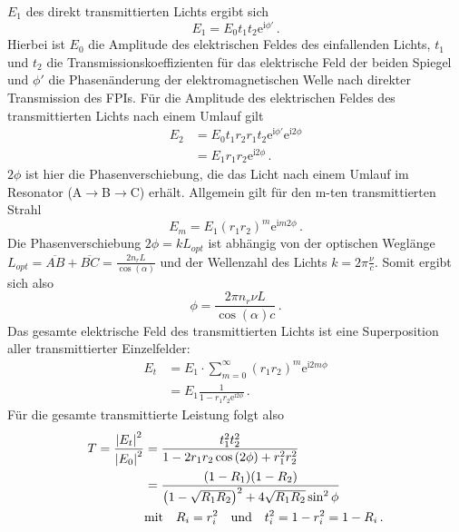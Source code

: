 $E_1$ des direkt transmittierten Lichts ergibt sich
\begin{equation}\label{eq:FPI_E1}
	E_1=E_0t_1t_2\mathrm{e}^{\mathrm{i}\phi'}\,.
\end{equation}
Hierbei ist $E_0$ die Amplitude des elektrischen Feldes des einfallenden Lichts,
$t_1$ und $t_2$ die Transmissionskoeffizienten für das elektrische Feld
der beiden Spiegel und $\phi'$ die Phasenänderung der elektromagnetischen Welle
nach direkter Transmission des FPIs. Für die Amplitude des elektrischen Feldes des
transmittierten Lichts nach einem Umlauf gilt
\begin{equation}\label{eq:FPI_E2}
	\begin{split}
		E_2
		&=E_0t_1r_2r_1t_2\mathrm{e}^{\mathrm{i}\phi'}\mathrm{e}^{\mathrm{i}2\phi}\\
		&=E_1r_1r_2\mathrm{e}^{\mathrm{i}2\phi}\,.
	\end{split}
\end{equation}
$2\phi$ ist hier die Phasenverschiebung, die das Licht nach einem Umlauf im
Resonator (A$\rightarrow$B$\rightarrow$C) erhält. Allgemein gilt für den m-ten
transmittierten Strahl
\begin{equation}\label{eq:FPI_Em}
	E_m=E_1(r_1r_2)^m\mathrm{e}^{\mathrm{i}m2\phi}\,.
\end{equation}
Die Phasenverschiebung $2\phi=kL_{opt}$ ist abhängig von der optischen Weglänge
$L_{opt}=\overline{AB}+\overline{BC}=\frac{2n_rL}{\cos{(\alpha)}}$ und der Wellenzahl des
Lichts $k=2\pi\frac{\nu}{c}$. Somit ergibt sich also
\begin{equation}\label{eq:FPI_phase}
	\phi=\frac{2\pi n_r\nu L}{\cos{(\alpha)}c}\,.
\end{equation}
Das gesamte elektrische Feld des transmittierten Lichts ist eine Superposition
aller transmittierter Einzelfelder:
\begin{equation}\label{eq:FPI_Et}
	\begin{split}
		E_t
		&=E_1\cdot\sum\limits_{m=0}^\infty(r_1r_2)^m\mathrm{e}^{\mathrm{i}2m\phi}\\
		&=E_1\frac{1}{1-r_1r_2\mathrm{e}^{\mathrm{i}2\phi}}\,.
	\end{split}
\end{equation}
Für die gesamte transmittierte Leistung folgt also
\begin{equation}\label{eq:FPI_transmission}
	\begin{split}
		T=\frac{\left|E_t\right|^2}{\left|E_0\right|^2}
		&=\frac{t_1^2t_2^2}{1-2r_1r_2\cos{(2\phi)}+r_1^2r_2^2}\\
		&=\frac{(1-R_1)(1-R_2)}{\left(1-\sqrt{R_1R_2}\right)^2+4\sqrt{R_1R_2}\sin^2{\phi}}\\
		&\text{mit}\quad
		R_i=r_i^2
		\quad\text{und}\quad
		t_i^2=1-r_i^2=1-R_i\,.
	\end{split}
\end{equation}
